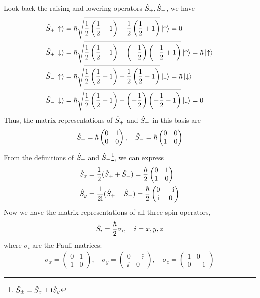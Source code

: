 Look back the raising and lowering operators $\hat{S}_+,\hat{S}_-$, we have
\begin{align}
    \hat{S}_+ \ket{\uparrow} & = \hbar \sqrt{\frac12 \left(\frac12 + 1\right) - \frac12 \left(\frac12 + 1\right)} \ket{\uparrow} = 0 \\
    \hat{S}_+ \ket{\downarrow} & = \hbar \sqrt{\frac12 \left(\frac12 + 1\right) - \left(-\frac12\right) \left(-\frac12 + 1\right)} \ket{\uparrow} = \hbar \ket{\uparrow} \\
    \hat{S}_- \ket{\uparrow} & = \hbar \sqrt{\frac12 \left(\frac12 + 1\right) - \frac12 \left(\frac12 - 1\right)} \ket{\downarrow} = \hbar \ket{\downarrow} \\
    \hat{S}_- \ket{\downarrow} & = \hbar \sqrt{\frac12 \left(\frac12 + 1\right) - \left(-\frac12\right) \left(-\frac12 - 1\right)} \ket{\downarrow} = 0
\end{align}
Thus, the matrix representations of $\hat{S}_+$ and $\hat{S}_-$ in this basis are
\begin{align}
    \hat{S}_+ = \hbar \begin{pmatrix} 0 & 1 \\ 0 & 0 \end{pmatrix}, \quad \hat{S}_- = \hbar \begin{pmatrix} 0 & 0 \\ 1 & 0 \end{pmatrix}
\end{align}
From the definitions of $\hat{S}_+$ and $\hat{S}_-$\footnote{$\hat{S}_{\pm} = \hat{S}_x \pm \mathrm{i} \hat{S}_y$}, we can express
\begin{align}
    \hat{S}_x & = \frac{1}{2} (\hat{S}_+ + \hat{S}_-) = \frac{\hbar}{2} \begin{pmatrix} 0 & 1 \\ 1 & 0 \end{pmatrix} \\
    \hat{S}_y & = \frac{1}{2\mathrm{i}} (\hat{S}_+ - \hat{S}_-) = \frac{\hbar}{2} \begin{pmatrix} 0 & -\mathrm{i} \\ \mathrm{i} & 0 \end{pmatrix}
\end{align}
Now we have the matrix representations of all three spin operators, 
\begin{align}
    \hat{S}_i = \frac{\hbar}{2} \sigma_i, \quad i=x,y,z
\end{align}
where $\sigma_i$ are the Pauli matrices:
\begin{align}
    \sigma_x = \begin{pmatrix} 0 & 1 \\ 1 & 0 \end{pmatrix}, \quad \sigma_y = \begin{pmatrix} 0 & -\ii \\ \ii & 0 \end{pmatrix}, \quad \sigma_z = \begin{pmatrix} 1 & 0 \\ 0 & -1 \end{pmatrix}
\end{align}
